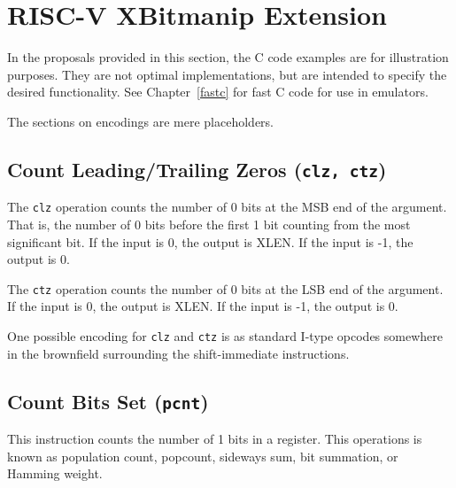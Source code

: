 \chapter{RISC-V XBitmanip Extension}
\label{bext}

In the proposals provided in this section, the C code examples are for
illustration purposes. They are not optimal implementations, but are intended
to specify the desired functionality. See Chapter~\ref{fastc} for fast C code
for use in emulators.

The sections on encodings are mere placeholders.


\section{Count Leading/Trailing Zeros (\texttt{clz, ctz})}

The {\tt clz} operation counts the number of 0 bits at the MSB end of the
argument.  That is, the number of 0 bits before the first 1 bit counting from
the most significant bit. If the input is 0, the output is XLEN. If the input
is -1, the output is 0.

The {\tt ctz} operation counts the number of 0 bits at the LSB end of the
argument. If the input is 0, the output is XLEN. If the input is -1, the
output is 0.





One possible encoding for \texttt{clz} and \texttt{ctz} is as standard I-type opcodes
somewhere in the brownfield surrounding the shift-immediate instructions.

%
%


\section{Count Bits Set (\texttt{pcnt})}

This instruction counts the number of 1 bits in a register. This operations is known as
population count, popcount, sideways sum, bit summation, or Hamming weight.~\cite{HammingWeight,Warren12}

